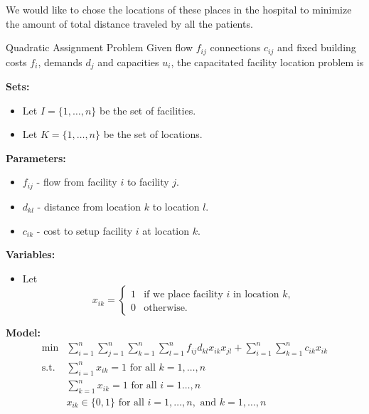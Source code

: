 We would like to chose the locations of these places in the hospital to minimize the amount of total distance traveled by all the patients. 






\begin{general}{Quadratic Assignment Problem}{\npcomplete}
Given flow $f_{ij}$  connections $c_{ij}$ and fixed building costs $f_i$, demands $d_j$ and capacities $u_i$, the capacitated facility location problem is 

\noindent \textbf{Sets:}
\begin{itemize}
\item Let $I = \{1,\dots, n\}$ be the set of facilities.
\item Let $K = \{1, \dots, n\}$ be the set of locations.
\end{itemize}

\noindent \textbf{Parameters:}
\begin{itemize}
\item $f_{ij}$ - flow from facility $i$ to facility $j$.
\item $d_{kl}$ - distance from location $k$ to location $l$.
\item $c_{ik}$ - cost to setup facility $i$ at location $k$.
\end{itemize}

\noindent \textbf{Variables:}
\begin{itemize}
\item Let 
\begin{equation*}
x_{ik} = \begin{cases}
1 & \text{if we place facility $i$ in location $k$,}\\
0 & \text{otherwise.}
\end{cases}
\end{equation*}
\end{itemize}

\noindent  \textbf{Model:}
\begin{align}
\min & \displaystyle\sum_{i=1}^n\sum_{j=1}^n \sum_{k=1}^n \sum_{l = 1}^n f_{ij}d_{kl}x_{ik}x_{jl} + \sum_{i=1}^n \sum_{k = 1}^n c_{ik} x_{ik} \tag{total cost}\\
\text{s.t.} & \displaystyle\sum_{i=1}^n x_{ik}=1 \text{ for all }k=1,\dots,n \tag{assign facility to location $k$}\\
& \displaystyle \sum_{k=1}^n x_{ik}=1 \text{ for all }i=1\dots,n \tag{assign one location to facility $i$}\\
&x_{ik}\in\{0,1\}\text{ for all } i=1,\dots,n, \text{ and } k = 1, \dots, n \tag{binary decisions}
\end{align}
\end{general}

